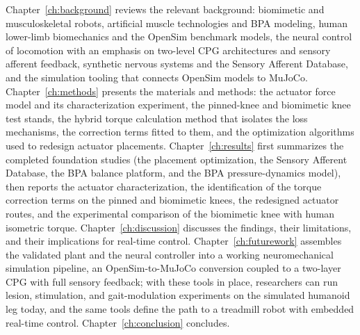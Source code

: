Chapter~\ref{ch:background} reviews the relevant background: biomimetic and musculoskeletal robots, artificial muscle technologies and BPA modeling, human lower-limb biomechanics and the OpenSim benchmark models, the neural control of locomotion with an emphasis on two-level CPG architectures and sensory afferent feedback, synthetic nervous systems and the Sensory Afferent Database, and the simulation tooling that connects OpenSim models to MuJoCo. Chapter~\ref{ch:methods} presents the materials and methods: the actuator force model and its characterization experiment, the pinned-knee and biomimetic knee test stands, the hybrid torque calculation method that isolates the loss mechanisms, the correction terms fitted to them, and the optimization algorithms used to redesign actuator placements. Chapter~\ref{ch:results} first summarizes the completed foundation studies (the placement optimization, the Sensory Afferent Database, the BPA balance platform, and the BPA pressure-dynamics model), then reports the actuator characterization, the identification of the torque correction terms on the pinned and biomimetic knees, the redesigned actuator routes, and the experimental comparison of the biomimetic knee with human isometric torque. Chapter~\ref{ch:discussion} discusses the findings, their limitations, and their implications for real-time control. Chapter~\ref{ch:futurework} assembles the validated plant and the neural controller into a working neuromechanical simulation pipeline, an OpenSim-to-MuJoCo conversion coupled to a two-layer CPG with full sensory feedback; with these tools in place, researchers can run lesion, stimulation, and gait-modulation experiments on the simulated humanoid leg today, and the same tools define the path to a treadmill robot with embedded real-time control. Chapter~\ref{ch:conclusion} concludes.
